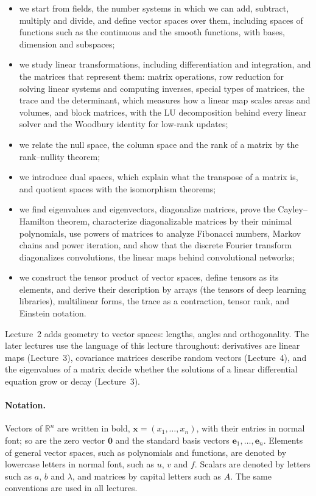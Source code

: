 \begin{itemize}
    \item we start from fields, the number systems in which we can add, subtract, multiply and divide, and define vector spaces over them, including spaces of functions such as the continuous and the smooth functions, with bases, dimension and subspaces;
    \item we study linear transformations, including differentiation and integration, and the matrices that represent them: matrix operations, row reduction for solving linear systems and computing inverses, special types of matrices, the trace and the determinant, which measures how a linear map scales areas and volumes, and block matrices, with the LU decomposition behind every linear solver and the Woodbury identity for low-rank updates;
    \item we relate the null space, the column space and the rank of a matrix by the rank--nullity theorem;
    \item we introduce dual spaces, which explain what the transpose of a matrix is, and quotient spaces with the isomorphism theorems;
    \item we find eigenvalues and eigenvectors, diagonalize matrices, prove the Cayley--Hamilton theorem, characterize diagonalizable matrices by their minimal polynomials, use powers of matrices to analyze Fibonacci numbers, Markov chains and power iteration, and show that the discrete Fourier transform diagonalizes convolutions, the linear maps behind convolutional networks;
    \item we construct the tensor product of vector spaces, define tensors as its elements, and derive their description by arrays (the tensors of deep learning libraries), multilinear forms, the trace as a contraction, tensor rank, and Einstein notation.
\end{itemize}
Lecture~2 adds geometry to vector spaces: lengths, angles and orthogonality. The later lectures use the language of this lecture throughout: derivatives are linear maps (Lecture~3), covariance matrices describe random vectors (Lecture~4), and the eigenvalues of a matrix decide whether the solutions of a linear differential equation grow or decay (Lecture~3).

\paragraph{Notation.} Vectors of $\mathbb{R}^n$ are written in bold, $\mathbf{x} = (x_1, \ldots, x_n)$, with their entries in normal font; so are the zero vector $\mathbf{0}$ and the standard basis vectors $\mathbf{e}_1, \ldots, \mathbf{e}_n$. Elements of general vector spaces, such as polynomials and functions, are denoted by lowercase letters in normal font, such as $u$, $v$ and $f$. Scalars are denoted by letters such as $a$, $b$ and $\lambda$, and matrices by capital letters such as $A$. The same conventions are used in all lectures.

